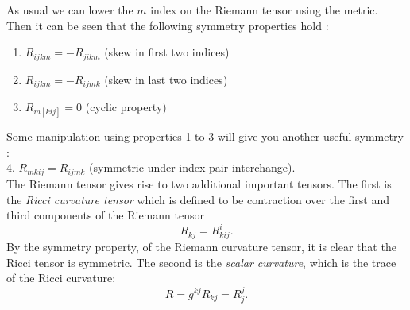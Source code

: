 
As usual we can lower the $m$ index on the Riemann tensor using the metric. Then it can be seen that the following symmetry properties hold \cite{Stephani}:
\begin{enumerate}
\item $R_{ijkm}=-R_{jikm}$ (skew in first two indices)
\item $R_{ijkm}=-R_{ijmk}$ (skew in last two indices)
\item $R_{m[kij]}=0$ (cyclic property)
\end{enumerate}
Some manipulation using properties 1 to 3 will give you another useful symmetry \cite{Lee}:\\

\hspace{0.4mm}4. $R_{mkij}=R_{ijmk}$ (symmetric under index pair interchange).\\

The Riemann tensor gives rise to two additional important tensors. The first is the \textit{Ricci curvature tensor} which is defined to be contraction over the first and third components of the Riemann tensor
\begin{equation} R_{kj}=R^i_{kij}. \label{Ricci} \end{equation}
By the symmetry property, of the Riemann curvature tensor, it is clear that the Ricci tensor is symmetric. The second is the \textit{scalar curvature}, which is the trace of the Ricci curvature:
\begin{equation} R=g^{kj}R_{kj}=R^j_j. \label{scalarcurv} \end{equation}


